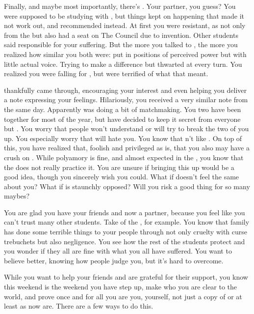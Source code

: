 \documentclass[char]{GL2020}
\begin{document}
Finally, and maybe most importantly, there's \cTechStar{\full}. Your partner, you guess? You were supposed to be studying with \cInitiate{}, but things kept on happening that made it not work out, and \cInitiate{\they} recommended \cTechStar{} instead. At first you were resistant, as \cTechStar{\theywere} not only from the \pTech{} but also had a seat on The Council due to \cTechStar{\their} invention. Other \pShippie{} students said \cTechStar{\theywere} responsible for your suffering. But the more you talked to \cTechStar{\them}, the more you realized how similar you both were: put in positions of perceived power but with little actual voice. Trying to make a difference but thwarted at every turn. You realized you were falling for \cTechStar{\them}, but were terrified of what that meant.

\cInitiate{} thankfully came through, encouraging your interest and even helping you deliver a note expressing your feelings. Hilariously, you received a very similar note from \cTechStar{} the same day. Apparently \cInitiate{} was doing a bit of matchmaking. You two have been together for most of the year, but have decided to keep it secret from everyone but \cInitiate{}. You worry that people won’t understand or will try to break the two of you up. You especially worry that \cPirateChild{} will hate you. You know that \cPirateChild{\theydo}n’t like \cTechStar{}. On top of this, you have realized that, foolish and privileged as \cInitiate{} is, that you also may have a crush on \cInitiate{\them}. While polyamory is fine, and almost expected in the \pShip{}, you know that the \pTech{} does not really practice it. You are unsure if bringing this up would be a good idea, though you sincerely wish you could. What if \cInitiate{} doesn’t feel the same about you? What if \cTechStar{} is staunchly opposed? Will you risk a good thing for so many maybes?

You are glad you have your friends and now a partner, because you feel like you can’t trust many other students. Take \cLibAssist{} of the \pFarm{}, for example. You know that \cLibAssist{\their} family has done some terrible things to your people through not only cruelty with curse trebuchets but also negligence. You see how the rest of the \pFarm{} students protect \cLibAssist{\them} and you wonder if they all are fine with what you all have suffered. You want to believe better, knowing how people judge you, but it's hard to overcome.

While you want to help your friends and are grateful for their support, you know this weekend is the weekend you have step up, make who you are clear to the world, and prove once and for all you are you, yourself, not just a copy of \cLoud{} or at least \cLoud{} as \cLoud{\they} now are.  There are a few ways to do this.  
\end{document}
